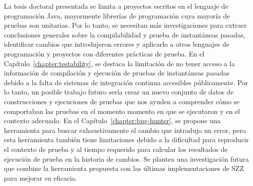 La tesis doctoral presentada se limita a proyectos escritos en el lenguaje de programación Java, mayormente librerías de programación cuya mayoría de pruebas son unitarias. Por lo tanto, se necesitan más investigaciones para extraer conclusiones generales sobre la compilabilidad y prueba de instantáneas pasadas, identificar cambios que introdujeron errores y aplicarlo a otros lenguajes de programación y proyectos con diferentes prácticas de prueba. En el Capítulo~\ref{chapter:testability}, se destaca la limitación de no tener acceso a la información de compilación y ejecución de pruebas de instantáneas pasadas debido a la falta de sistemas de integración continua accesibles públicamente. 
Por lo tanto, un posible trabajo futuro sería crear un nuevo conjunto de datos de construcciones y ejecuciones de pruebas que nos ayuden a comprender cómo se comportaban las pruebas en el momento momento en que se ejecutaron y en el contexto adecuado.
En el Capítulo~\ref{chapter:bug-hunter}, se propone una herramienta para buscar exhaustivamente el cambio que introdujo un error, pero esta herramienta también tiene limitaciones debido a la dificultad para reproducir el contexto de prueba y al tiempo requerido para calcular los resultados de ejecución de prueba en la historia de cambios. Se plantea una investigación futura que combine la herramienta propuesta con las últimas implementaciones de SZZ para mejorar su eficacia.
